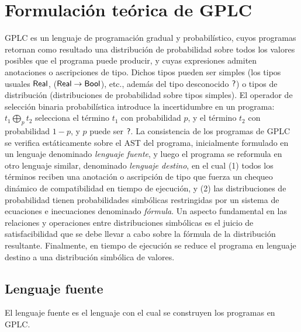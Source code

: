 
\chapter{Formulación teórica de GPLC}\label{sec:abstract-gplc}
GPLC es un lenguaje de programación gradual y probabilístico, cuyos
programas retornan como resultado una distribución de probabilidad
sobre todos los valores posibles que el programa puede producir, y
cuyas expresiones admiten anotaciones o ascripciones de tipo. Dichos
tipos pueden ser simples (los tipos usuales $\mathord{\text{\sffamily Real}}$,
($\mathord{\text{\sffamily Real}} \to \mathord{\text{\sffamily Bool}}$), etc., además del tipo desconocido $\mathord{\text{\sffamily ?}}$) o tipos
de distribución (distribuciones de probabilidad sobre tipos
simples). El operador de selección binaria probabilística introduce la
incertidumbre en un programa: $t_1 \bigoplus_p t_2$ selecciona el
término $t_1$ con probabilidad $p$, y el término $t_2$ con
probabilidad $1-p$, y $p$ puede ser $\mathord{\text{\sffamily ?}}$. La consistencia de los
programas de GPLC se verifica estáticamente sobre el AST del programa,
inicialmente formulado en un lenguaje denominado \emph{lenguaje
  fuente}, y luego el programa se reformula en otro lenguaje similar,
denominado \emph{lenguaje destino}, en el cual {(1)} todos los
términos reciben una anotación o ascripción de tipo que fuerza un
chequeo dinámico de compatibilidad en tiempo de ejecución, y {(2)} las
distribuciones de probabilidad tienen probabilidades simbólicas
restringidas por un sistema de ecuaciones e inecuaciones denominado
\emph{fórmula}. Un aspecto fundamental en las relaciones y operaciones
entre distribuciones simbólicas es el juicio de satisfacibilidad que
se debe llevar a cabo sobre la fórmula de la distribución
resultante. Finalmente, en tiempo de ejecución se reduce el programa
en lenguaje destino a una distribución simbólica de valores.

\section{Lenguaje fuente}\label{sec:source-language}


El lenguaje fuente es el lenguaje con el cual se construyen los
programas en GPLC.


